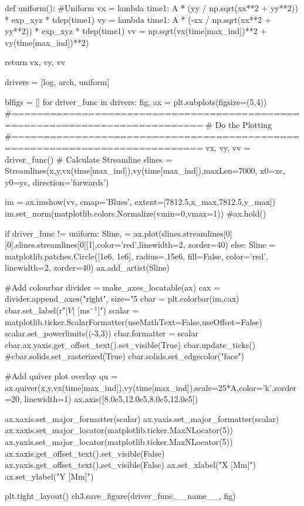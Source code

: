 \begin{pycode}[chapter3]
def uniform():
    #Uniform
    vx = lambda time1: A * (yy / np.sqrt(xx**2 + yy**2)) * exp_xyz * tdep(time1)
    vy = lambda time1: A * (-xx / np.sqrt(xx**2 + yy**2)) * exp_xyz * tdep(time1)
    vv = np.sqrt(vx(time[max_ind])**2 + vy(time[max_ind])**2)
    
    return vx, vy, vv

drivers = [log, arch, uniform]

blfigs = []
for driver_func in drivers:
    fig, ax = plt.subplots(figsize=(5,4))
    #============================================================================
    # Do the Plotting
    #============================================================================
    vx, vy, vv = driver_func()
    # Calculate Streamline
    slines = Streamlines(x,y,vx(time[max_ind]),vy(time[max_ind]),maxLen=7000,
                         x0=xc, y0=yc, direction='forwards')

    im = ax.imshow(vv, cmap='Blues', extent=[7812.5,x_max,7812.5,y_max])
    im.set_norm(matplotlib.colors.Normalize(vmin=0,vmax=1))
    #ax.hold()
    
    if driver_func != uniform:
        Sline, = ax.plot(slines.streamlines[0][0],slines.streamlines[0][1],color='red',linewidth=2, zorder=40)
    else:
	    Sline = matplotlib.patches.Circle([1e6, 1e6], radius=.15e6, fill=False, color='red', linewidth=2, zorder=40)
	    ax.add_artist(Sline)

    #Add colourbar
    divider = make_axes_locatable(ax)
    cax = divider.append_axes("right", size="5%
    cbar = plt.colorbar(im,cax)
    cbar.set_label(r"$|V|$ [ms$^{-1}$]")
    scalar = matplotlib.ticker.ScalarFormatter(useMathText=False,useOffset=False)
    scalar.set_powerlimits((-3,3))
    cbar.formatter = scalar
    cbar.ax.yaxis.get_offset_text().set_visible(True)
    cbar.update_ticks()
    #cbar.solids.set_rasterized(True)
    cbar.solids.set_edgecolor("face")

    #Add quiver plot overlay
    qu = ax.quiver(x,y,vx(time[max_ind]),vy(time[max_ind]),scale=25*A,color='k',zorder=20, linewidth=1)
    ax.axis([8.0e5,12.0e5,8.0e5,12.0e5])

    ax.xaxis.set_major_formatter(scalar)
    ax.yaxis.set_major_formatter(scalar)
    ax.xaxis.set_major_locator(matplotlib.ticker.MaxNLocator(5))
    ax.yaxis.set_major_locator(matplotlib.ticker.MaxNLocator(5))
    ax.xaxis.get_offset_text().set_visible(False)
    ax.yaxis.get_offset_text().set_visible(False)
    ax.set_xlabel("X [Mm]")
    ax.set_ylabel("Y [Mm]")

    plt.tight_layout()
    ch3.save_figure(driver_func.__name__, fig)

\end{pycode}

